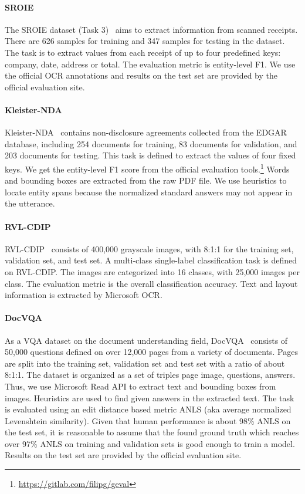 \documentclass{article} \usepackage{iclr2021_conference,times}
\begin{document}
\paragraph{SROIE}

The SROIE dataset (Task 3)~\citep{8977955} aims to extract information from scanned receipts. There are 626 samples for training and 347 samples for testing in the dataset. The task is to extract values from each receipt of up to four predefined keys: company, date, address or total. The evaluation metric is entity-level F1. We use the official OCR annotations and results on the test set are provided by the official evaluation site.

\paragraph{Kleister-NDA}

Kleister-NDA~\citep{graliski2020kleister} contains non-disclosure agreements collected from the EDGAR database, including 254 documents for training, 83 documents for validation, and 203 documents for testing. This task is defined to extract the values of four fixed keys. We get the entity-level F1 score from the official evaluation tools.\footnote{\scriptsize\url{https://gitlab.com/filipg/geval}} Words and bounding boxes are extracted from the raw PDF file. We use heuristics to locate entity spans because the normalized standard answers may not appear in the utterance.

\paragraph{RVL-CDIP}

RVL-CDIP~\citep{harley2015icdar} consists of 400,000 grayscale images, with 8:1:1 for the training set, validation set, and test set. A multi-class single-label classification task is defined on RVL-CDIP. The images are categorized into 16 classes, with 25,000 images per class. The evaluation metric is the overall classification accuracy. Text and layout information is extracted by Microsoft OCR.

\paragraph{DocVQA}

As a VQA dataset on the document understanding field, DocVQA~\citep{mathew2020docvqa} consists of 50,000 questions defined on over 12,000 pages from a variety of documents. Pages are split into the training set, validation set and test set with a ratio of about 8:1:1. The dataset is organized as a set of triples page image, questions, answers. Thus, we use Microsoft Read API to extract text and bounding boxes from images. Heuristics are used to find given answers in the extracted text. The task is evaluated using an edit distance based metric ANLS (aka average normalized Levenshtein similarity). Given that human performance is about 98\% ANLS on the test set, it is reasonable to assume that the found ground truth which reaches over 97\% ANLS on training and validation sets is good enough to train a model. Results on the test set are provided by the official evaluation site.
\end{document}
